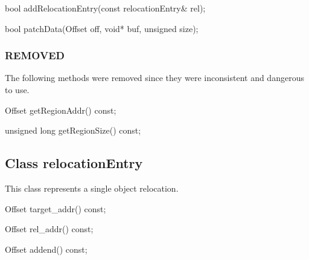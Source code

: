 \begin{apient}
bool addRelocationEntry(const relocationEntry& rel);
\end{apient}

\begin{apient}
bool patchData(Offset off,
               void* buf,
               unsigned size);
\end{apient}

\subsubsection{REMOVED}

The following methods were removed since they were inconsistent and dangerous to use.

\begin{apient}
Offset getRegionAddr() const;
\end{apient}

\begin{apient}
unsigned long getRegionSize() const;
\end{apient}

\subsection{Class relocationEntry}
This class represents a single object relocation.

\begin{apient}
Offset target_addr() const;
\end{apient}

\begin{apient}
Offset rel_addr() const;
\end{apient}

\begin{apient}
Offset addend() const;
\end{apient}

